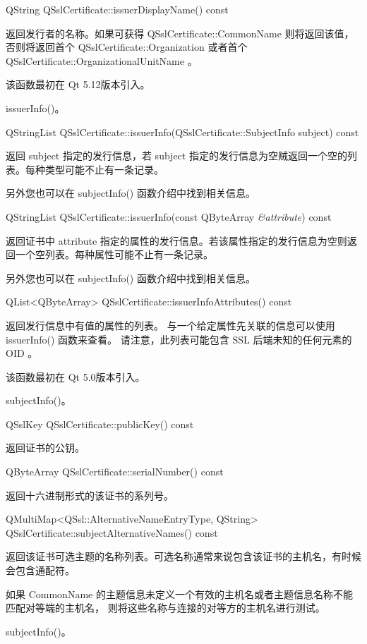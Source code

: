 QString QSslCertificate::issuerDisplayName() const

返回发行者的名称。如果可获得 QSslCertificate::CommonName 则将返回该值，
否则将返回首个 QSslCertificate::Organization
 或者首个 QSslCertificate::OrganizationalUnitName 。

该函数最初在 Qt 5.12版本引入。

\begin{seeAlso}
issuerInfo()。
\end{seeAlso}

QStringList QSslCertificate::issuerInfo(QSslCertificate::SubjectInfo subject) const

返回 subject 指定的发行信息，若 subject 指定的发行信息为空贼返回一个空的列表。每种类型可能不止有一条记录。

另外您也可以在 subjectInfo() 函数介绍中找到相关信息。

QStringList QSslCertificate::issuerInfo(const QByteArray \emph{\&attribute}) const

返回证书中 attribute 指定的属性的发行信息。若该属性指定的发行信息为空则返回一个空列表。每种属性可能不止有一条记录。

另外您也可以在 subjectInfo() 函数介绍中找到相关信息。

QList<QByteArray> QSslCertificate::issuerInfoAttributes() const

返回发行信息中有值的属性的列表。
与一个给定属性先关联的信息可以使用 issuerInfo() 函数来查看。
请注意，此列表可能包含 SSL 后端未知的任何元素的 OID 。

该函数最初在 Qt 5.0版本引入。

\begin{seeAlso}
subjectInfo()。
\end{seeAlso}

QSslKey QSslCertificate::publicKey() const

返回证书的公钥。

QByteArray QSslCertificate::serialNumber() const

返回十六进制形式的该证书的系列号。

QMultiMap<QSsl::AlternativeNameEntryType, QString> QSslCertificate::subjectAlternativeNames() const

返回该证书可选主题的名称列表。可选名称通常来说包含该证书的主机名，有时候会包含通配符。

如果 CommonName 的主题信息未定义一个有效的主机名或者主题信息名称不能匹配对等端的主机名，
则将这些名称与连接的对等方的主机名进行测试。

\begin{seeAlso}
subjectInfo()。
\end{seeAlso}

